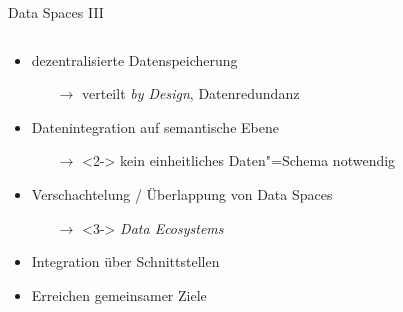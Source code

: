 \begin{frame}{Data Spaces III \footnotesize\cite{mollerIndustrialDataEcosystems2024}}
    \begin{columns}
        \begin{column}{0.6\textwidth}
            \begin{itemize}
                \item dezentralisierte Datenspeicherung
                \begin{itemize}
                    \item[$\to$] verteilt \emph{by Design}, Datenredundanz
                \end{itemize}
                
                \item<2-> Datenintegration auf semantische Ebene
                \begin{itemize}
                    \item[$\to$]<2-> kein einheitliches Daten"=Schema notwendig
                \end{itemize}
                
                \item<3-> Verschachtelung / Überlappung von Data Spaces
                \begin{itemize}
                    \item[$\to$]<3-> \emph{Data Ecosystems}
                \end{itemize}
                
                \item<4-> Integration über Schnittstellen
                \item<4-> Erreichen gemeinsamer Ziele
            \end{itemize}
        \end{column}


\end{columns}
\end{frame}

